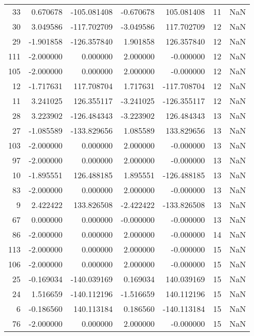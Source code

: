 \begin{tabular}{rrrrrrr}
 33 &  0.670678 & -105.081408 & -0.670678 &  105.081408 &          11 & NaN \\
 30 &  3.049586 & -117.702709 & -3.049586 &  117.702709 &          12 & NaN \\
 29 & -1.901858 & -126.357840 &  1.901858 &  126.357840 &          12 & NaN \\
111 & -2.000000 &    0.000000 &  2.000000 &   -0.000000 &          12 & NaN \\
105 & -2.000000 &    0.000000 &  2.000000 &   -0.000000 &          12 & NaN \\
 12 & -1.717631 &  117.708704 &  1.717631 & -117.708704 &          12 & NaN \\
 11 &  3.241025 &  126.355117 & -3.241025 & -126.355117 &          12 & NaN \\
 28 &  3.223902 & -126.484343 & -3.223902 &  126.484343 &          13 & NaN \\
 27 & -1.085589 & -133.829656 &  1.085589 &  133.829656 &          13 & NaN \\
103 & -2.000000 &    0.000000 &  2.000000 &   -0.000000 &          13 & NaN \\
 97 & -2.000000 &    0.000000 &  2.000000 &   -0.000000 &          13 & NaN \\
 10 & -1.895551 &  126.488185 &  1.895551 & -126.488185 &          13 & NaN \\
 83 & -2.000000 &    0.000000 &  2.000000 &   -0.000000 &          13 & NaN \\
  9 &  2.422422 &  133.826508 & -2.422422 & -133.826508 &          13 & NaN \\
 67 &  0.000000 &    0.000000 & -0.000000 &   -0.000000 &          13 & NaN \\
 86 & -2.000000 &    0.000000 &  2.000000 &   -0.000000 &          14 & NaN \\
113 & -2.000000 &    0.000000 &  2.000000 &   -0.000000 &          15 & NaN \\
106 & -2.000000 &    0.000000 &  2.000000 &   -0.000000 &          15 & NaN \\
 25 & -0.169034 & -140.039169 &  0.169034 &  140.039169 &          15 & NaN \\
 24 &  1.516659 & -140.112196 & -1.516659 &  140.112196 &          15 & NaN \\
  6 & -0.186560 &  140.113184 &  0.186560 & -140.113184 &          15 & NaN \\
 76 & -2.000000 &    0.000000 &  2.000000 &   -0.000000 &          15 & NaN \\

\end{tabular}

